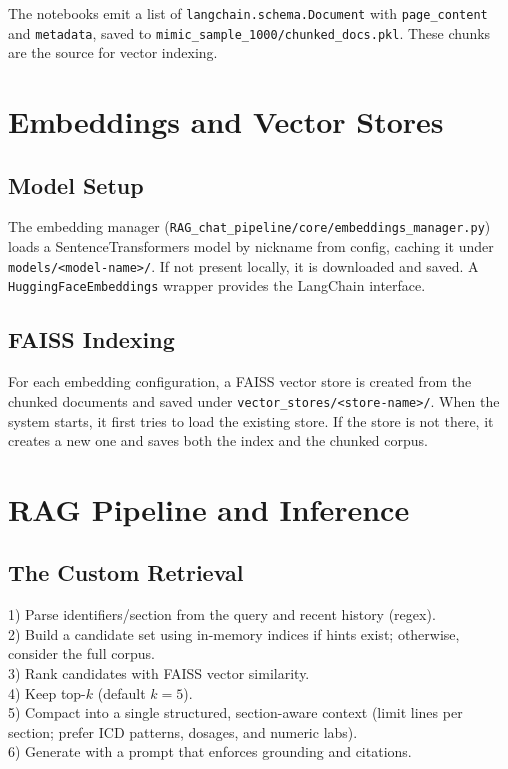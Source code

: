 \noindent The notebooks emit a list of \texttt{langchain.schema.Document} with \texttt{page\_content} and \texttt{metadata}, saved to \texttt{mimic\_sample\_1000/chunked\_docs.pkl}. These chunks are the source for vector indexing.

\section{Embeddings and Vector Stores}

\subsection{Model Setup}
The embedding manager (\texttt{RAG\_chat\_pipeline/core/embeddings\_manager.py}) loads a SentenceTransformers model by nickname from config, caching it under \texttt{models/<model-name>/}. If not present locally, it is downloaded and saved. A \texttt{HuggingFaceEmbeddings} wrapper provides the LangChain interface.

\subsection{FAISS Indexing}
For each embedding configuration, a FAISS vector store is created from the chunked documents and saved under \texttt{vector\_stores/<store-name>/}. When the system starts, it first tries to load the existing store. If the store is not there, it creates a new one and saves both the index and the chunked corpus.
\newpage
\section{RAG Pipeline and Inference}

\subsection{The Custom Retrieval}
1) Parse identifiers/section from the query and recent history (regex).\\
2) Build a candidate set using in-memory indices if hints exist; otherwise, consider the full corpus.\\
3) Rank candidates with FAISS vector similarity.\\
4) Keep top-\(k\) (default \(k=5\)).\\
5) Compact into a single structured, section-aware context (limit lines per section; prefer ICD patterns, dosages, and numeric labs).\\
6) Generate with a prompt that enforces grounding and citations.

